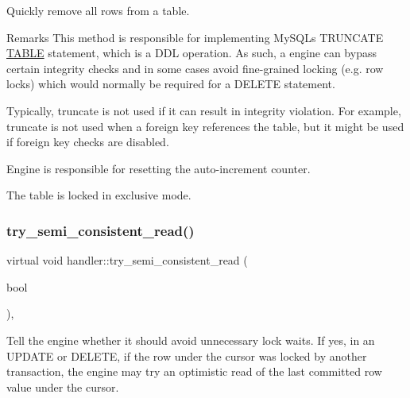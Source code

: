 Quickly remove all rows from a table.

\begin{DoxyRemark}{Remarks}
This method is responsible for implementing My\+S\+QL\textquotesingle{}s T\+R\+U\+N\+C\+A\+TE \mbox{\hyperlink{structTABLE}{T\+A\+B\+LE}} statement, which is a D\+DL operation. As such, a engine can bypass certain integrity checks and in some cases avoid fine-\/grained locking (e.\+g. row locks) which would normally be required for a D\+E\+L\+E\+TE statement.

Typically, truncate is not used if it can result in integrity violation. For example, truncate is not used when a foreign key references the table, but it might be used if foreign key checks are disabled.

Engine is responsible for resetting the auto-\/increment counter.

The table is locked in exclusive mode. 
\end{DoxyRemark}
\mbox{\label{classhandler_ab3e767094bff139a26743e9314df8476}} 
\subsubsection{\texorpdfstring{try\+\_\+semi\+\_\+consistent\+\_\+read()}{try\_semi\_consistent\_read()}}
{\footnotesize\ttfamily virtual void handler\+::try\+\_\+semi\+\_\+consistent\+\_\+read (\begin{DoxyParamCaption}\item[{bool}]{ }\end{DoxyParamCaption})\hspace{0.3cm}{\ttfamily [inline]}, {\ttfamily [virtual]}}

Tell the engine whether it should avoid unnecessary lock waits. If yes, in an U\+P\+D\+A\+TE or D\+E\+L\+E\+TE, if the row under the cursor was locked by another transaction, the engine may try an optimistic read of the last committed row value under the cursor. \mbox{\label{classhandler_a8059bbed3de416b3bea51c69dc064e79}} 
